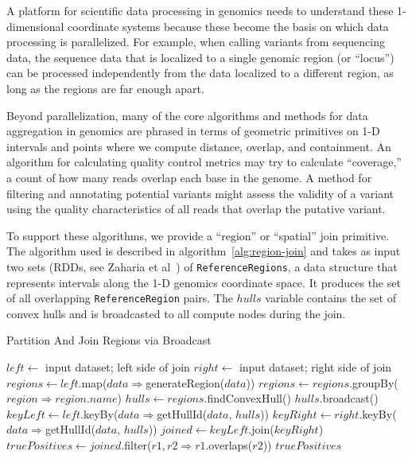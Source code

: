 \documentclass[phd]{ucbthesis}
\begin{document}
A platform for scientific data processing in genomics needs to understand these 1-dimensional coordinate
systems because these become the basis on which data processing is parallelized. For example, when calling
variants from sequencing data, the sequence data that is localized to a single genomic region (or ``locus'') can be 
processed independently from the data localized to a different region, as long as the regions are far enough
apart.

Beyond parallelization, many of the core algorithms and methods for data aggregation in genomics are phrased
in terms of geometric primitives on 1-D intervals and points where we compute distance, overlap, and
containment.  An algorithm for calculating quality control metrics may try to calculate ``coverage,'' a count
of how many reads overlap each base in the genome. A method for filtering and annotating potential variants
might assess the validity of a variant using the quality characteristics of all reads that overlap the putative variant.

To support these algorithms, we provide a ``region'' or ``spatial'' join primitive. The algorithm used is described
in algorithm~\ref{alg:region-join} and takes as input two sets (RDDs, see Zaharia et al~\cite{zaharia12}) of
\texttt{ReferenceRegions}, a data structure that represents intervals along the 1-D genomics coordinate
space. It produces the set of all overlapping \texttt{ReferenceRegion} pairs. The $hulls$ variable contains
the set of convex hulls and is broadcasted to all compute nodes during the join.

\begin{algorithm}
\caption{Partition And Join Regions via Broadcast}
\label{alg:region-join}
\begin{algorithmic}
\STATE $left \leftarrow$ input dataset; left side of join
\STATE $right \leftarrow$ input dataset; right side of join
\STATE $regions \leftarrow left$.map($data \Rightarrow $generateRegion($data$))
\STATE $regions \leftarrow regions$.groupBy($region \Rightarrow region$.$name$)
\STATE $hulls \leftarrow regions$.findConvexHull()
\STATE $hulls$.broadcast()
\STATE $keyLeft \leftarrow left$.keyBy($data \Rightarrow $getHullId($data$, $hulls$))
\STATE $keyRight \leftarrow right$.keyBy($data \Rightarrow $getHullId($data$, $hulls$))
\STATE $joined \leftarrow keyLeft$.join($keyRight$)
\STATE $truePositives \leftarrow joined$.filter($r1, r2 \Rightarrow r1$.overlaps($r2$))
\RETURN $truePositives$
\end{algorithmic}
\end{algorithm}
\end{document}
